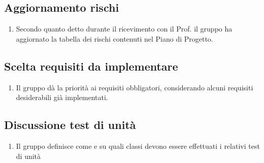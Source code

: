 \documentclass[11pt,a4paper]{article}
\begin{document}
	\subsection{Aggiornamento rischi}
	\begin{enumerate}
	\item Secondo quanto detto durante il ricevimento con il Prof. il gruppo ha aggiornato la tabella dei rischi contenuti nel Piano di Progetto.
	\end{enumerate}
	
		\subsection{Scelta requisiti da implementare}
	\begin{enumerate}
		\item Il gruppo dà la priorità ai requisiti obbligatori, considerando alcuni requisiti desiderabili già implementati.
	\end{enumerate}
	\subsection{Discussione test di unità}
	\begin{enumerate}
		\item Il gruppo definisce come e su quali classi devono essere effettuati i relativi test di unità

	\end{enumerate}
	
\end{document}

